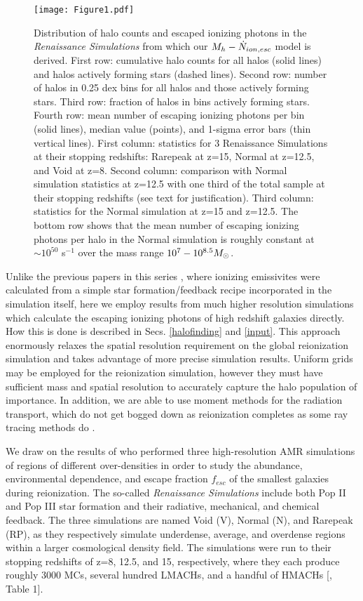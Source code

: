 \documentclass[iop,apj]{emulateapj}
\begin{document}
\begin{figure*}
\centering \texttt{[image: Figure1.pdf]}
\caption{Distribution of halo counts and escaped ionizing photons in the {\it Renaissance Simulations} from which our $M_h - \dot{N}_{ion,esc}$ model is derived. First row: cumulative halo counts for all halos (solid lines) and halos actively forming stars (dashed lines). Second row: number of halos in 0.25 dex bins for all halos and those actively forming stars. Third row: fraction of halos in bins actively forming stars. Fourth row: mean number of escaping ionizing photons per bin (solid lines), median value (points), and 1-sigma error bars (thin vertical lines). First column: statistics for 3 Renaissance Simulations at their stopping redshifts: Rarepeak at z=15, Normal at z=12.5, and Void at z=8. Second column: comparison with Normal simulation statistics at z=12.5 with one third of the total sample at their stopping redshifts (see text for justification). Third column: statistics for the Normal simulation at z=15 and z=12.5. The bottom row shows that the mean number of escaping ionizing photons per halo in the Normal simulation is roughly constant at $\sim 10^{50}$ s$^{-1}$ over the mass range $10^7 - 10^{8.5} \Ms$.  } 
\label{fig:halo-counts}
\end{figure*}


Unlike the previous papers in this series \citep{So14,Norman13}, where ionizing emissivites were calculated from a simple star formation/feedback recipe incorporated in the simulation itself, here we employ results from much higher resolution simulations which calculate the escaping ionizing photons of high redshift galaxies directly. How this is done is described in Secs. \ref{halofinding} and \ref{input}. This approach enormously relaxes the spatial resolution requirement on the global reionization simulation and takes advantage of more precise simulation results. Uniform grids may be employed for the reionization simulation, however they must have sufficient mass and spatial resolution to accurately capture the halo population of importance. In addition, we are able to use moment methods for the radiation transport, which do not get bogged down as reionization completes as some ray tracing methods do \citep{Norman13}. 

We draw on the results of  \cite{Xu16} who performed three high-resolution AMR simulations of regions of different over-densities in order to study the abundance, environmental dependence, and escape fraction $f_{esc}$ of the smallest galaxies during reionization. The so-called {\it Renaissance Simulations} include both Pop II and Pop III star formation and their radiative, mechanical, and chemical feedback. The three simulations are named Void (V), Normal (N), and Rarepeak (RP), as they respectively simulate underdense, average, and overdense regions within a larger cosmological density field. The simulations were run to their stopping redshifts of z=8, 12.5, and 15, respectively, where they each produce roughly 3000 MCs, several hundred LMACHs, and a handful of HMACHs  [\citet{Xu16}, Table 1].  
\end{document}
